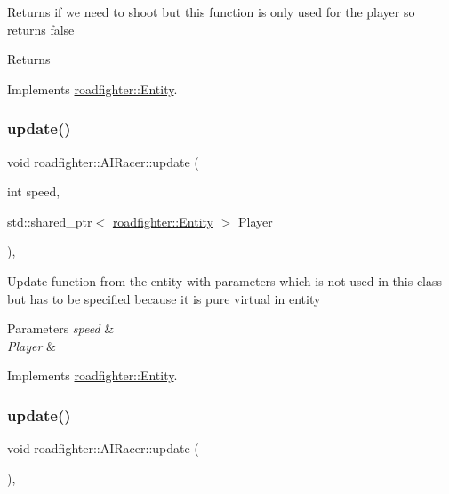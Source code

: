 Returns if we need to shoot but this function is only used for the player so returns false \begin{DoxyReturn}{Returns}

\end{DoxyReturn}


Implements \hyperlink{classroadfighter_1_1Entity_ad0ecaa0539db252e591da83814251509}{roadfighter\+::\+Entity}.

\mbox{\label{classroadfighter_1_1AIRacer_ab6156385195b3d40d44360d40aafa3a6}} 
\subsubsection{\texorpdfstring{update()}{update()}\hspace{0.1cm}{\footnotesize\ttfamily [1/2]}}
{\footnotesize\ttfamily void roadfighter\+::\+A\+I\+Racer\+::update (\begin{DoxyParamCaption}\item[{int}]{speed,  }\item[{std\+::shared\+\_\+ptr$<$ \hyperlink{classroadfighter_1_1Entity}{roadfighter\+::\+Entity} $>$}]{Player }\end{DoxyParamCaption})\hspace{0.3cm}{\ttfamily [override]}, {\ttfamily [virtual]}}

Update function from the entity with parameters which is not used in this class but has to be specified because it is pure virtual in entity 
\begin{DoxyParams}{Parameters}
{\em speed} & \\
\hline
{\em Player} & \\
\hline
\end{DoxyParams}


Implements \hyperlink{classroadfighter_1_1Entity_a611ba56595dd2137d308876ba820cc09}{roadfighter\+::\+Entity}.

\mbox{\label{classroadfighter_1_1AIRacer_a92afd3d1bfcd290d3b012cbfe44d5a77}} 
\subsubsection{\texorpdfstring{update()}{update()}\hspace{0.1cm}{\footnotesize\ttfamily [2/2]}}
{\footnotesize\ttfamily void roadfighter\+::\+A\+I\+Racer\+::update (\begin{DoxyParamCaption}{ }\end{DoxyParamCaption})\hspace{0.3cm}{\ttfamily [override]}, {\ttfamily [virtual]}}

